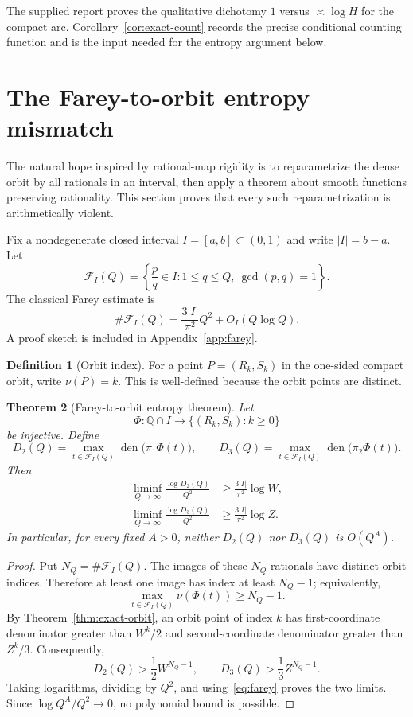 \documentclass[11pt]{article}
\newtheorem{theorem}{Theorem}[section]
\theoremstyle{definition}
\newtheorem{definition}[theorem]{Definition}
\theoremstyle{remark}
\newcommand{\Q}{\mathbb Q}
\newcommand{\den}{\operatorname{den}}
\begin{document}
The supplied report proves the qualitative dichotomy $1$ versus $\asymp\log H$ for the
compact arc.  Corollary~\ref{cor:exact-count} records the precise conditional counting
function and is the input needed for the entropy argument below.

\section{The Farey-to-orbit entropy mismatch}
\label{sec:farey}

The natural hope inspired by rational-map rigidity is to reparametrize the dense orbit by all
rationals in an interval, then apply a theorem about smooth functions preserving rationality.
This section proves that every such reparametrization is arithmetically violent.

Fix a nondegenerate closed interval $I=[a,b]\subset(0,1)$ and write $|I|=b-a$.  Let
\[
 \mathcal F_I(Q)=\left\{\frac pq\in I:
 1\le q\le Q,\ \gcd(p,q)=1\right\}.
\]
The classical Farey estimate is
\begin{equation}
 \#\mathcal F_I(Q)=\frac{3|I|}{\pi^2}Q^2+O_I(Q\log Q).
 \label{eq:farey}
\end{equation}
A proof sketch is included in Appendix~\ref{app:farey}.

\begin{definition}[Orbit index]
For a point $P=(R_k,S_k)$ in the one-sided compact orbit, write $\nu(P)=k$.
This is well-defined because the orbit points are distinct.
\end{definition}

\begin{theorem}[Farey-to-orbit entropy theorem]\label{thm:farey-orbit}
Let
\[
 \Phi:\Q\cap I\longrightarrow\{(R_k,S_k):k\ge0\}
\]
be injective.  Define
\[
 D_2(Q)=\max_{t\in\mathcal F_I(Q)}\den\bigl(\pi_1\Phi(t)\bigr),
 \qquad
 D_3(Q)=\max_{t\in\mathcal F_I(Q)}\den\bigl(\pi_2\Phi(t)\bigr).
\]
Then
\begin{align}
 \liminf_{Q\to\infty}\frac{\log D_2(Q)}{Q^2}
 &\ge \frac{3|I|}{\pi^2}\log W,
 \label{eq:D2entropy}\\
 \liminf_{Q\to\infty}\frac{\log D_3(Q)}{Q^2}
 &\ge \frac{3|I|}{\pi^2}\log Z.
 \label{eq:D3entropy}
\end{align}
In particular, for every fixed $A>0$, neither $D_2(Q)$ nor $D_3(Q)$ is $O(Q^A)$.
\end{theorem}

\begin{proof}
Put $N_Q=\#\mathcal F_I(Q)$.  The images of these $N_Q$ rationals have distinct orbit
indices.  Therefore at least one image has index at least $N_Q-1$; equivalently,
\[
 \max_{t\in\mathcal F_I(Q)}\nu(\Phi(t))\ge N_Q-1.
\]
By Theorem~\ref{thm:exact-orbit}, an orbit point of index $k$ has first-coordinate
denominator greater than $W^k/2$ and second-coordinate denominator greater than $Z^k/3$.
Consequently,
\[
 D_2(Q)>\frac12W^{N_Q-1},
 \qquad
 D_3(Q)>\frac13Z^{N_Q-1}.
\]
Taking logarithms, dividing by $Q^2$, and using~\eqref{eq:farey} proves the two limits.
Since $\log Q^A/Q^2\to0$, no polynomial bound is possible.
\end{proof}
\end{document}
